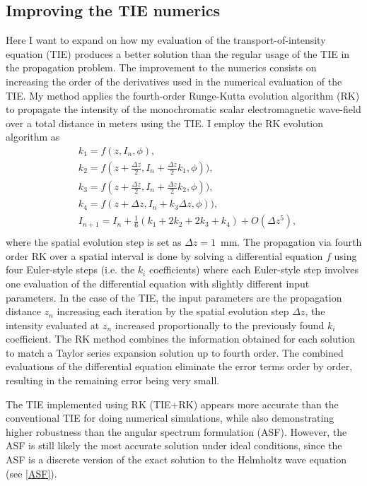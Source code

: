\documentclass[10pt, a4paper, singlespacing]{report}
\begin{document}
\subsection{Improving the TIE numerics}\label{TIE+RK}
Here I want to expand on how my evaluation of the transport-of-intensity equation (TIE) produces a better solution than the regular usage of the TIE in the propagation problem.
The improvement to the numerics consists on increasing the order of the derivatives used in the numerical evaluation of the TIE. My method applies the fourth-order Runge-Kutta evolution algorithm (RK) to propagate the intensity of the monochromatic scalar electromagnetic wave-field over a total distance in meters using the TIE. I employ the RK evolution algorithm as
\begin{equation} \label{eq:17}
\begin{split}
&k_1 = f(z, I_n, \phi),\\
&k_2 = f(z + \frac{\Delta z}{2}, I_n + \frac{\Delta z }{2}k_1, \phi)),\\
&k_3 = f(z + \frac{\Delta z}{2}, I_n + \frac{\Delta z }{2}k_2, \phi)),\\
&k_4 = f(z + \Delta z, I_n + k_3 \Delta z, \phi)),\\
&I_{n + 1} = I_{n} + \frac{1}{6}(k_1 + 2k_2 + 2k_3 + k_4) + O(\Delta z^5),\\
\end{split}
\end{equation}
where the spatial evolution step is set as $\Delta z = 1$~mm. The propagation via fourth order RK over a spatial interval is done by solving a differential equation $f$ using four Euler-style steps (i.e. the $k_i$ coefficients) where each Euler-style step involves one evaluation of the differential equation with slightly different input parameters. In the case of the TIE, the input parameters are the propagation distance $z_n$ increasing each iteration by the spatial evolution step $\Delta z$, the intensity evaluated at $z_n$ increased proportionally to the previously found $k_i$ coefficient. The RK method combines the information obtained for each solution to match a Taylor series expansion solution up to fourth order. The combined evaluations of the differential equation eliminate the error terms order by order, resulting in the remaining error being very small\cite{N_R}.

The TIE implemented using RK (TIE+RK) appears more accurate than the conventional TIE for doing numerical simulations, while also demonstrating higher robustness than the angular spectrum formulation (ASF). However, the ASF is still likely the most accurate solution under ideal conditions, since the ASF is a discrete version of the exact solution to the Helmholtz wave equation (see \ref{ASF}).
\end{document}
